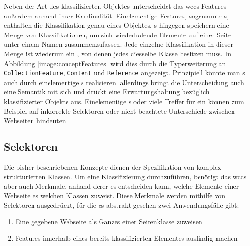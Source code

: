         Neben der Art des klassifizierten Objektes unterscheidet das \gls{wccs} Features
        außerdem anhand ihrer Kardinalität.
        Einelementige Features, sogenannte {\scalarFeature}s, enthalten die Klassifikation genau eines Objektes.
        {\collectionFeature}s hingegen speichern eine Menge von Klassifikationen,
        um sich wiederholende Elemente auf einer Seite unter einem Namen zusammenzufassen.
        Jede einzelne Klassifikation in dieser Menge ist wiederum ein {\scalarFeature},
        von denen jedes diesselbe Klasse besitzen muss.
        In Abbildung \ref{image:conceptFeatures} wird dies durch die Typerweiterung an
        \texttt{CollectionFeature}, \texttt{Content} und \texttt{Reference} angezeigt.
        Prinzipiell könnte man {\scalarFeature}s auch durch einelementige {\collectionFeature}s realisieren,
        allerdings bringt die Unterscheidung auch eine Semantik mit sich und drückt eine
        Erwartungshaltung bezüglich klassifizierter Objekte aus.       
        Einelementige {\collectionFeature}s oder viele Treffer für ein {\scalarFeature}
        können zum Beispiel auf inkorrekte Selektoren oder nicht beachtete Unterschiede zwischen Webseiten hindeuten.

    \subsection{Selektoren}
        \label{section:conteptSelectors}
        Die bisher beschriebenen Konzepte dienen der Spezifikation von komplex strukturierten Klassen.
        Um eine Klassifizierung durchzuführen, benötigt das \gls{wccs} aber auch Merkmale,
        anhand derer es entscheiden kann,
        welche Elemente einer Webseite es welchen Klassen zuweist.
        Diese Merkmale werden mithilfe von Selektoren ausgedrückt,
        für die es abstrakt gesehen zwei Anwendungsfälle gibt:

        \begin{enumerate}
            \item Eine gegebene Webseite als Ganzes einer Seitenklasse zuweisen
            \item Features innerhalb eines bereits klassifizierten Elementes ausfindig machen
        \end{enumerate}

